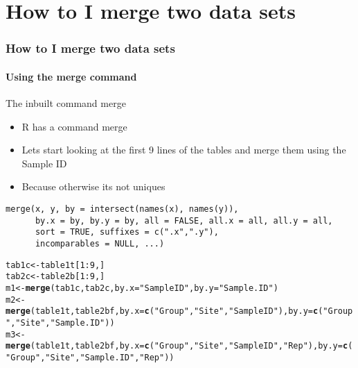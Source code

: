 \documentclass[12pt]{beamer}\usepackage[]{graphicx}\usepackage[]{color}
\makeatletter
\newcommand{\hlnum}[1]{\textcolor[rgb]{0.686,0.059,0.569}{#1}}%
\newcommand{\hlstr}[1]{\textcolor[rgb]{0.192,0.494,0.8}{#1}}%
\newcommand{\hlopt}[1]{\textcolor[rgb]{0,0,0}{#1}}%
\newcommand{\hlstd}[1]{\textcolor[rgb]{0.345,0.345,0.345}{#1}}%
\newcommand{\hlkwb}[1]{\textcolor[rgb]{0.69,0.353,0.396}{#1}}%
\newcommand{\hlkwc}[1]{\textcolor[rgb]{0.333,0.667,0.333}{#1}}%
\newcommand{\hlkwd}[1]{\textcolor[rgb]{0.737,0.353,0.396}{\textbf{#1}}}%
\newenvironment{kframe}{%
 \def\at@end@of@kframe{}%
 \ifinner\ifhmode%
  \def\at@end@of@kframe{\end{minipage}}%
  \begin{minipage}{\columnwidth}%
 \fi\fi%
 \def\FrameCommand##1{\hskip\@totalleftmargin \hskip-\fboxsep
 \colorbox{shadecolor}{##1}\hskip-\fboxsep
     \hskip-\linewidth \hskip-\@totalleftmargin \hskip\columnwidth}%
 \MakeFramed {\advance\hsize-\width
   \@totalleftmargin\z@ \linewidth\hsize
   \@setminipage}}%
 {\par\unskip\endMakeFramed%
 \at@end@of@kframe}
\newenvironment{knitrout}{}{} %
\makeatother
\begin{document}
\section*{How to I merge two data sets}
\begin{frame}[fragile]
  \frametitle{How to I merge two data sets}
  \framesubtitle{Using the merge command}

\begin{block}{The inbuilt command merge}
\begin{itemize}
\item R has a command merge
\item Lets start looking at the first 9 lines of the tables and merge them using the Sample ID
\item Because otherwise its not uniques
\end{itemize}
\end{block}
\begin{lstlisting}
merge(x, y, by = intersect(names(x), names(y)),
      by.x = by, by.y = by, all = FALSE, all.x = all, all.y = all,
      sort = TRUE, suffixes = c(".x",".y"),
      incomparables = NULL, ...)
\end{lstlisting}

\begin{knitrout}
\color{fgcolor}\begin{kframe}
\begin{alltt}
\hlstd{tab1c}\hlkwb{<-}\hlstd{table1t[}\hlnum{1}\hlopt{:}\hlnum{9}\hlstd{,]}
\hlstd{tab2c}\hlkwb{<-}\hlstd{table2b[}\hlnum{1}\hlopt{:}\hlnum{9}\hlstd{,]}
\hlstd{m1}\hlkwb{<-}\hlkwd{merge}\hlstd{(tab1c,tab2c,}\hlkwc{by.x}\hlstd{=}\hlstr{"Sample ID"}\hlstd{,}\hlkwc{by.y}\hlstd{=}\hlstr{"Sample.ID"}\hlstd{)}
\hlstd{m2}\hlkwb{<-}\hlkwd{merge}\hlstd{(table1t,table2bf,}\hlkwc{by.x}\hlstd{=}\hlkwd{c}\hlstd{(}\hlstr{"Group"}\hlstd{,}\hlstr{"Site"}\hlstd{,}\hlstr{"Sample ID"}\hlstd{),}\hlkwc{by.y}\hlstd{=}\hlkwd{c}\hlstd{(}\hlstr{"Group"}\hlstd{,}\hlstr{"Site"}\hlstd{,}\hlstr{"Sample.ID"}\hlstd{))}
\hlstd{m3}\hlkwb{<-}\hlkwd{merge}\hlstd{(table1t,table2bf,}\hlkwc{by.x}\hlstd{=}\hlkwd{c}\hlstd{(}\hlstr{"Group"}\hlstd{,}\hlstr{"Site"}\hlstd{,}\hlstr{"Sample ID"}\hlstd{,}\hlstr{"Rep"}\hlstd{),}\hlkwc{by.y}\hlstd{=}\hlkwd{c}\hlstd{(}\hlstr{"Group"}\hlstd{,}\hlstr{"Site"}\hlstd{,}\hlstr{"Sample.ID"}\hlstd{,}\hlstr{"Rep"}\hlstd{))}
\end{alltt}
\end{kframe}
\end{knitrout}
\end{frame}  
\end{document}
